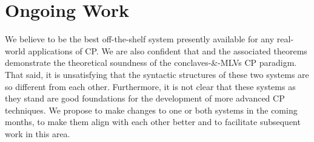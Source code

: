 \chapter{Ongoing Work}
\label{sec:future}

We believe \MultiChor to be the best off-the-shelf system presently available for any real-world applications of CP.
We are also confident that \HLSCentral and the associated theorems demonstrate the theoretical soundness of the conclaves-\&-MLVs
CP paradigm.
That said, it is unsatisfying that the syntactic structures of these two systems are so different from each other.
Furthermore, it is not clear that these systems as they stand are good foundations for the development of more advanced CP techniques.
We propose to make changes to one or both systems in the coming months,
to make them align with each other better
and to facilitate subsequent work in this area.

